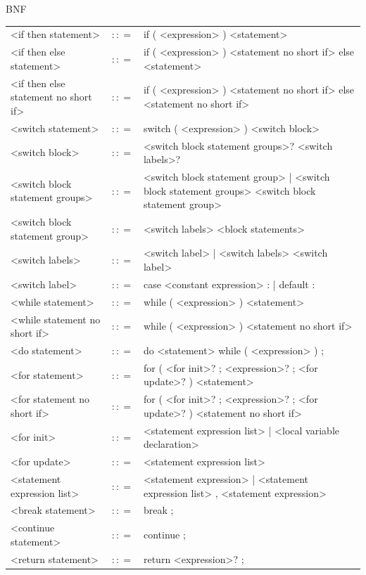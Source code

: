 \documentclass[landscape, 11pt]{article}
\begin{document}
\begin{qsection}{BNF}
\begin{enumerate}[label=\bt{\theenumi.}]
\begin{longtable}{R{7cm} c L{15cm}}
				\\
				<if then statement>							&	$\colon\colon=$	&	if ( <expression> ) <statement>
				\\
				<if then else statement>					&	$\colon\colon=$	&	if ( <expression> ) <statement no short if> else <statement>
				\\
				<if then else statement no short if>		&	$\colon\colon=$	&	if ( <expression> ) <statement no short if> else <statement no short if>
				\\
				<switch statement>							&	$\colon\colon=$	&	switch ( <expression> ) <switch block>
				\\
				<switch block>								&	$\colon\colon=$	&	{ <switch block statement groups>? <switch labels>? }
				\\
				<switch block statement groups>				&	$\colon\colon=$	&	<switch block statement group> | <switch block statement groups> <switch block statement group>
				\\
				<switch block statement group>				&	$\colon\colon=$	&	<switch labels> <block statements>
				\\
				<switch labels>								&	$\colon\colon=$	&	<switch label> | <switch labels> <switch label>
				\\
				<switch label>								&	$\colon\colon=$	&	case <constant expression> : | default :
				\\
				<while statement>							&	$\colon\colon=$	&	while ( <expression> ) <statement>
				\\
				<while statement no short if>				&	$\colon\colon=$	&	while ( <expression> ) <statement no short if>
				\\
				<do statement>								&	$\colon\colon=$	&	do <statement> while ( <expression> ) ;
				\\
				<for statement>								&	$\colon\colon=$	&	for ( <for init>? ; <expression>? ; <for update>? ) <statement>
				\\
				<for statement no short if>					&	$\colon\colon=$	&	for ( <for init>? ; <expression>? ; <for update>? ) <statement no short if>
				\\
				<for init>									&	$\colon\colon=$	&	<statement expression list> | <local variable declaration>
				\\
				<for update>								&	$\colon\colon=$	&	<statement expression list>
				\\
				<statement expression list>					&	$\colon\colon=$	&	<statement expression> | <statement expression list> , <statement expression>
				\\
				<break statement>							&	$\colon\colon=$	&	break ;
				\\
				<continue statement>						&	$\colon\colon=$	&	continue ;
				\\
				<return statement>							&	$\colon\colon=$	&	return <expression>? ;
			\end{longtable}


\end{enumerate}
\end{qsection}
\end{document}
